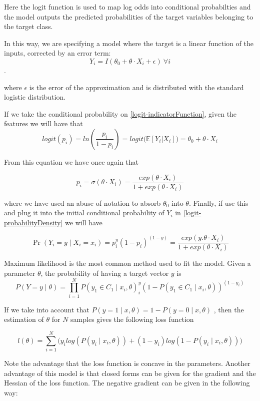 \documentclass{article}%
\newcommand{\Expect}{{\mathbb{E}}}
\theoremstyle{definition}
\begin{document}
Here the logit function is used to map log odds into conditional probabilties and the model outputs the predicted probabilities of the target variables belonging to the target class.

In this way, we are specifying a model where the target is a linear function of the inputs, corrected by an error term:
$$Y_i = I(\theta_0 + \theta \cdot X_i + \epsilon) \ \forall i$$. \label{logit-indicatorFunction}

where $\epsilon$ is the error of the approximation and is distributed with the standard logistic distribution. %

If we take the conditional probability on \ref{logit-indicatorFunction}, given the features we will have that
$$logit(p_i)= ln(\frac{p_i}{1-p_i}) = logit\big( \Expect[Y_i| X_i] \big) = 	\theta_0 + \theta \cdot X_i$$

From this equation we have once again that


$$p_i = \sigma(\theta \cdot X_i) = \frac{exp(\theta \cdot X_i) }{1 + exp(\theta \cdot X_i)}$$

where we have used an abuse of notation to absorb $\theta_0$ into $\theta$. Finally, if use this and plug it into the initial conditional probability of $Y_i$ in \ref{logit-probabilityDensity} we will have

$$  \Pr(Y_i=y \mid X_i = x_i) =  p_i^{y} (1-p_i)^{(1-y)} = \frac{exp(y . \theta \cdot X_i) }{1 + exp(\theta \cdot X_i)}$$


Maximum likelihood is the most common method used to fit the model. %
Given a parameter $\theta$, the probability of having a target vector $y$ is 
\[
P(Y =y \mid \theta )  = \prod_{i=1}^N P(y_1 \in C_1 \mid x_i, \theta)^y_i(1 - P(y_1 \in C_1 \mid x_i, \theta) )^{(1-y_i)}
\]

If we take into account that $P(y=1 \mid x,\theta) = 1 - P(y=0 \mid x,\theta)$ , then the estimation of $\theta$ for $N$ samples gives the following loss function

\[
l(\theta) = \sum_{i=1}^N \big(y_i log(P(y_i \mid x_i,\theta)) + (1-y_i)log(1 - P(y_i \mid x_i,\theta) ) \big)
\]

Note the advantage that the loss function is concave in the parameters. Another advantage of this model is that closed forms can be given for the gradient and the Hessian of the loss function. The negative gradient can be given in the following way: %
\end{document}
